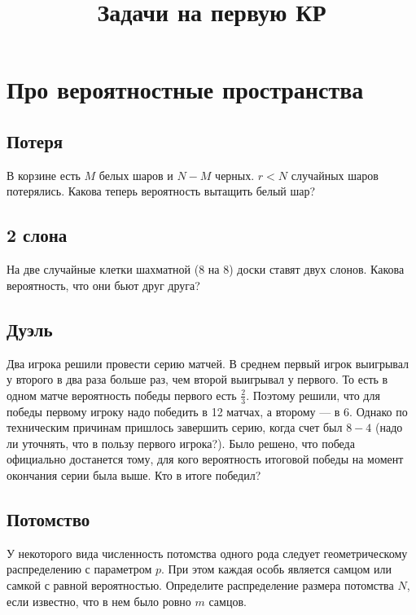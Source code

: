 \documentclass[12pt]{article}
\title{Задачи на первую КР}
\begin{document}
\maketitle

\section{Про вероятностные пространства}

\subsection{Потеря}

В корзине есть $M$ белых шаров и $N - M$ черных. $r < N$ случайных шаров потерялись. Какова теперь вероятность вытащить белый шар?

\subsection{2 слона}

На две случайные клетки шахматной (8 на 8) доски ставят двух слонов. Какова вероятность, что они бьют друг друга?

\subsection{Дуэль}

Два игрока решили провести серию матчей. В среднем первый игрок выигрывал у второго в два раза больше раз, чем второй выигрывал у первого. То есть в одном матче вероятность победы первого есть $\frac{2}{3}$. Поэтому решили, что для победы первому игроку надо победить в 12 матчах, а второму --- в 6. Однако по техническим причинам пришлось завершить серию, когда счет был $8-4$ (надо ли уточнять, что в пользу первого игрока?). Было решено, что победа официально достанется тому, для кого вероятность итоговой победы на момент окончания серии была выше. Кто в итоге победил?

\subsection{Потомство}

У некоторого вида численность потомства одного рода следует геометрическому распределению с параметром $p$. При этом каждая особь является самцом или самкой с равной вероятностью. Определите распределение размера потомства $N$, если известно, что в нем было ровно $m$ самцов.
\end{document}
